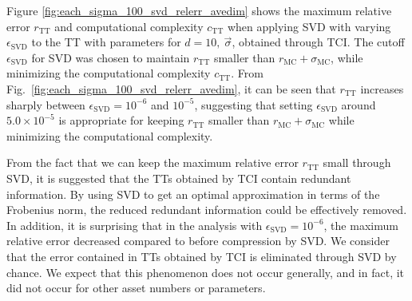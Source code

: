 Figure \ref{fig:each_sigma_100_svd_relerr_avedim} shows the maximum relative error $r_{\mathrm{TT}}$ and computational complexity $c_{\mathrm{TT}}$ when applying SVD with varying $\epsilon_{\mathrm{SVD}}$ to the TT with parameters for $d = 10,~\vec{\sigma}$, obtained through TCI. 
The cutoff $\epsilon_{\text{SVD}}$ for SVD was chosen to maintain $r_{\mathrm{TT}}$ smaller than $r_{\mathrm{MC}} + \sigma_{\text{MC}}$, while minimizing the computational complexity $c_{\mathrm{TT}}$. 
From Fig.~\ref{fig:each_sigma_100_svd_relerr_avedim}, it can be seen that $r_{\mathrm{TT}}$ increases sharply between $\epsilon_{\mathrm{SVD}} = 10^{-6}$ and $10^{-5}$, suggesting that setting $\epsilon_{\text{SVD}}$ around $5.0 \times 10^{-5}$ is appropriate for keeping $r_{\mathrm{TT}}$ smaller than $r_{\mathrm{MC}} + \sigma_{\text{MC}}$ while minimizing the computational complexity.

From the fact that we can keep the maximum relative error $r_{\mathrm{TT}}$ small through SVD, it is suggested that the TTs obtained by TCI contain redundant information. By using SVD to get an optimal approximation in terms of the Frobenius norm, the reduced redundant information could be effectively removed. 
In addition, it is surprising that in the analysis with $\epsilon_{\text{SVD}} = 10^{-6}$, the maximum relative error decreased compared to before compression by SVD.
We consider that the error contained in TTs obtained by TCI is eliminated through SVD by chance.
We expect that this phenomenon does not occur generally, and in fact, it did not occur for other asset numbers or parameters.













